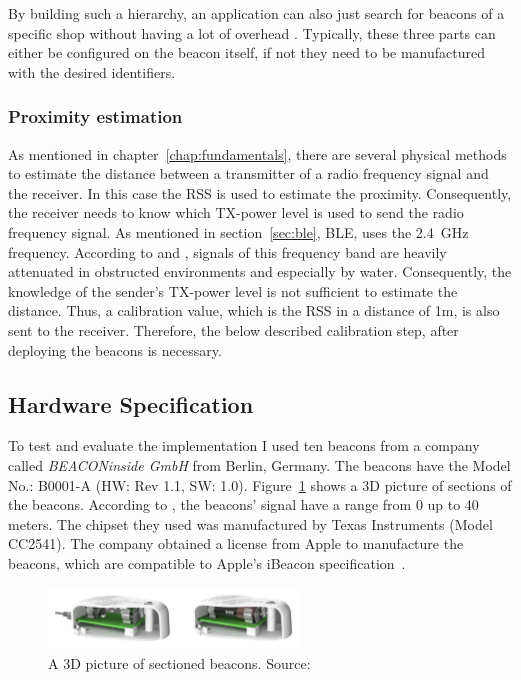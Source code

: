 \noindent By building such a hierarchy, an application can also just search for beacons of a specific shop without having a lot of overhead \citep{apple:getting_started,binside:ds}. Typically, these three parts can either be configured on the beacon itself, if not they need to be manufactured with the desired identifiers.

\subsubsection*{Proximity estimation}
As mentioned in chapter~\ref{chap:fundamentals}, there are several physical methods to estimate the distance between a transmitter of a radio frequency signal and the receiver. In this case the \acf{RSS} is used to estimate the proximity. Consequently, the receiver needs to know which \acs{TX}-power level is used to send the radio frequency signal. As mentioned in section~\ref{sec:ble}, \ac{BLE}, uses the 2.4~GHz frequency. According to \citet{apple:getting_started} and \citet{binside:ds}, signals of this frequency band are heavily attenuated in obstructed environments and especially by water. Consequently, the knowledge of the sender's \acs{TX}-power level is not sufficient to estimate the distance. Thus, a calibration value, which is the \acl{RSS} in a distance of 1m, is also sent to the receiver. Therefore, the below described calibration step, after deploying the beacons is necessary.

\subsection{Hardware Specification}
To test and evaluate the implementation I used ten beacons from a company called \emph{BEACONinside GmbH} from Berlin, Germany. The beacons have the Model No.: B0001-A (HW: Rev 1.1, SW: 1.0). Figure~\ref{fig:bi:beacons} shows a 3D picture of sections of the beacons. According to \citet{binside:ds}, the beacons' signal have a range from 0 up to 40 meters. The chipset they used was manufactured by Texas Instruments (Model CC2541). The company obtained a license from Apple to manufacture the beacons, which are compatible to Apple's iBeacon specification~\citep{binside:ds}.

\begin{figure}
	\includegraphics[width=0.6\textwidth]{figures/BEACONinside_beacons}
	\caption{A 3D picture of sectioned beacons. Source:~\citep{binside:ds}}
	\label{fig:bi:beacons}
\end{figure}

